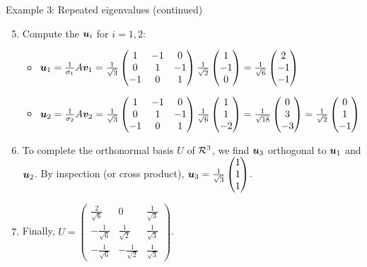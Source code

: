 \documentclass[aspectratio=169]{beamer}\usepackage[]{graphicx}\usepackage[]{xcolor}
\begin{document}
\begin{frame}{Example 3: Repeated eigenvalues (continued)}
\begin{enumerate}
\setcounter{enumi}{4}
\item Compute the $\bm{u}_i$ for $i=1,2$:
\begin{itemize}
\item $\bm{u}_1 = \frac{1}{\sigma_1}A\bm{v}_1 = \frac{1}{\sqrt{3}}\begin{pmatrix} 1 & -1 & 0 \\ 0 & 1 & -1 \\ -1 & 0 & 1 \end{pmatrix}\frac{1}{\sqrt{2}}\begin{pmatrix} 1 \\ -1 \\ 0 \end{pmatrix} = \frac{1}{\sqrt{6}}\begin{pmatrix} 2 \\ -1 \\ -1 \end{pmatrix}$
\item $\bm{u}_2 = \frac{1}{\sigma_2}A\bm{v}_2 = \frac{1}{\sqrt{3}}\begin{pmatrix} 1 & -1 & 0 \\ 0 & 1 & -1 \\ -1 & 0 & 1 \end{pmatrix}\frac{1}{\sqrt{6}}\begin{pmatrix} 1 \\ 1 \\ -2 \end{pmatrix} = \frac{1}{\sqrt{18}}\begin{pmatrix} 0 \\ 3 \\ -3 \end{pmatrix} = \frac{1}{\sqrt{2}}\begin{pmatrix} 0 \\ 1 \\ -1 \end{pmatrix}$
\end{itemize}
\item To complete the orthonormal basis $U$ of $\mathcal{R}^3$, we find $\bm{u}_3$ orthogonal to $\bm{u}_1$ and $\bm{u}_2$. By inspection (or cross product), $\bm{u}_3 = \frac{1}{\sqrt{3}}\begin{pmatrix} 1 \\ 1 \\ 1 \end{pmatrix}$.
\item Finally, $U = \begin{pmatrix} \frac{2}{\sqrt{6}} & 0 & \frac{1}{\sqrt{3}} \\ -\frac{1}{\sqrt{6}} & \frac{1}{\sqrt{2}} & \frac{1}{\sqrt{3}} \\ -\frac{1}{\sqrt{6}} & -\frac{1}{\sqrt{2}} & \frac{1}{\sqrt{3}} \end{pmatrix}$.
\end{enumerate}
\end{frame}
\end{document}
